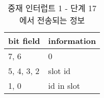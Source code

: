 %
%
\begin{table}[htbp]
\caption{중재 인터럽트 1 - 단계 17에서 전송되는 정보}\label{table:arb-int-p17}
   \begin{center}
   \begin{tabular}{|l|l|} \hline
	bit field & information \\
\hline \hline
	7, 6 & 0 \\
	5, 4, 3, 2 & slot id \\
	1, 0 & id in slot \\
\hline
   \end{tabular}
   \end{center}
\end{table}
%
%
